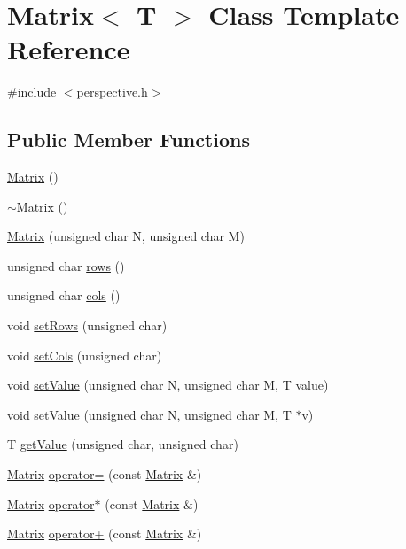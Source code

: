 \hypertarget{classMatrix}{}\section{Matrix$<$ T $>$ Class Template Reference}
\label{classMatrix}


{\ttfamily \#include $<$perspective.\+h$>$}

\subsection*{Public Member Functions}
\begin{DoxyCompactItemize}
\item 
\hyperlink{classMatrix_a0a749e62910dfcc12d8b00407ef0a2a2}{Matrix} ()
\item 
\hyperlink{classMatrix_ad5eddf41615ebc5c9f5591a35db1e933}{$\sim$\+Matrix} ()
\item 
\hyperlink{classMatrix_a25008f0e9c92c7c183f6078e811612e9}{Matrix} (unsigned char N, unsigned char M)
\item 
unsigned char \hyperlink{classMatrix_a304418db8e8fb7aa03692bfeb796dff5}{rows} ()
\item 
unsigned char \hyperlink{classMatrix_ae8619d1c450cfb9350f4e7dea15829cf}{cols} ()
\item 
void \hyperlink{classMatrix_ab8835ab2ead30efc83a08a57b7fbc0b5}{set\+Rows} (unsigned char)
\item 
void \hyperlink{classMatrix_a4c10fcb50c25493c4aa659afb40af389}{set\+Cols} (unsigned char)
\item 
void \hyperlink{classMatrix_a93ef7d0fc33aa6285abf13d4ad68de51}{set\+Value} (unsigned char N, unsigned char M, T value)
\item 
void \hyperlink{classMatrix_acc444f9feaad1c768ed3909fd1620b2f}{set\+Value} (unsigned char N, unsigned char M, T $\ast$v)
\item 
T \hyperlink{classMatrix_a5ad4a5158889b177b4e0e3c467166b50}{get\+Value} (unsigned char, unsigned char)
\item 
\hyperlink{classMatrix}{Matrix} \hyperlink{classMatrix_a8415b3b7a2ce35d7e0847d7a20844524}{operator=} (const \hyperlink{classMatrix}{Matrix} \&)
\item 
\hyperlink{classMatrix}{Matrix} \hyperlink{classMatrix_a35591b3f6accbf593620e7bd370eb046}{operator$\ast$} (const \hyperlink{classMatrix}{Matrix} \&)
\item 
\hyperlink{classMatrix}{Matrix} \hyperlink{classMatrix_a1b247e6d18a403a2cc4a27e72e7dc82b}{operator+} (const \hyperlink{classMatrix}{Matrix} \&)
\end{DoxyCompactItemize}



